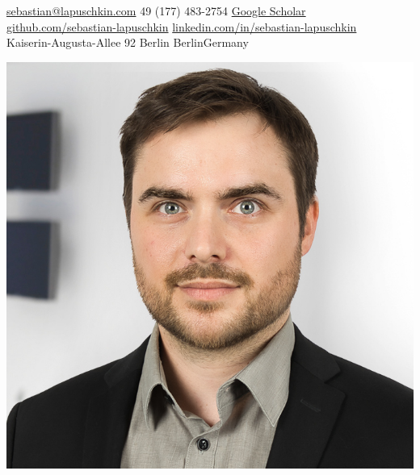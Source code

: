 \documentclass[10pt,a4paper]{article} %
\begin{document}

\noindent
\begin{minipage}{.8\textwidth}


\noindent\href{mailto:sebastian@lapuschkin.com}{sebastian@lapuschkin.com}\bull %
\textsmaller{+}49 (177) 483-2754\bull %
\href{https://scholar.google.com/citations?user=wpLQuroAAAAJ}{Google Scholar}
\\
\href{https://github.com/sebastian-lapuschkin}{github.com/sebastian-lapuschkin}\bull %
\href{https://www.linkedin.com/in/sebastian-lapuschkin}{linkedin.com/in/sebastian-lapuschkin} %
\\
Kaiserin-Augusta-Allee 92 Berlin \bull Berlin\bull Germany %
\end{minipage}
\begin{minipage}{.2\textwidth}
\includegraphics[width=\textwidth]{resources/mug-2021.jpg}
\end{minipage}
\end{document}
